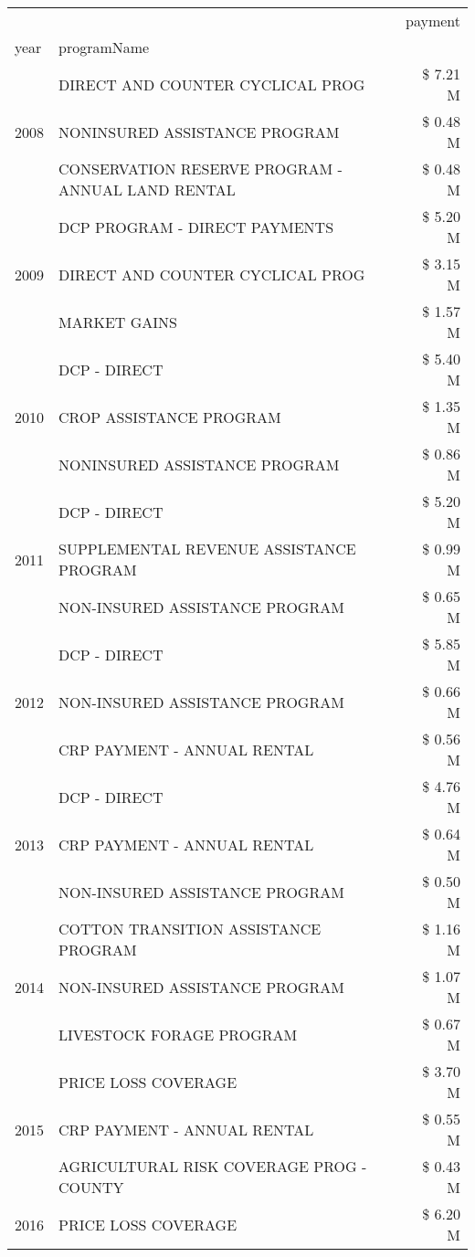 \begin{tabular}{llr}
\toprule
 &  & payment \\
year & programName &  \\
\midrule
\multirow[t]{3}{*}{2008} & DIRECT AND COUNTER CYCLICAL PROG & \$ 7.21 M \\
 & NONINSURED ASSISTANCE PROGRAM & \$ 0.48 M \\
 & CONSERVATION RESERVE PROGRAM - ANNUAL LAND RENTAL & \$ 0.48 M \\
\cline{1-3}
\multirow[t]{3}{*}{2009} & DCP PROGRAM - DIRECT PAYMENTS & \$ 5.20 M \\
 & DIRECT AND COUNTER CYCLICAL PROG & \$ 3.15 M \\
 & MARKET GAINS & \$ 1.57 M \\
\cline{1-3}
\multirow[t]{3}{*}{2010} & DCP - DIRECT & \$ 5.40 M \\
 & CROP ASSISTANCE PROGRAM & \$ 1.35 M \\
 & NONINSURED ASSISTANCE PROGRAM & \$ 0.86 M \\
\cline{1-3}
\multirow[t]{3}{*}{2011} & DCP - DIRECT & \$ 5.20 M \\
 & SUPPLEMENTAL REVENUE ASSISTANCE PROGRAM & \$ 0.99 M \\
 & NON-INSURED ASSISTANCE PROGRAM & \$ 0.65 M \\
\cline{1-3}
\multirow[t]{3}{*}{2012} & DCP - DIRECT & \$ 5.85 M \\
 & NON-INSURED ASSISTANCE PROGRAM & \$ 0.66 M \\
 & CRP PAYMENT - ANNUAL RENTAL & \$ 0.56 M \\
\cline{1-3}
\multirow[t]{3}{*}{2013} & DCP - DIRECT & \$ 4.76 M \\
 & CRP PAYMENT - ANNUAL RENTAL & \$ 0.64 M \\
 & NON-INSURED ASSISTANCE PROGRAM & \$ 0.50 M \\
\cline{1-3}
\multirow[t]{3}{*}{2014} & COTTON TRANSITION ASSISTANCE PROGRAM & \$ 1.16 M \\
 & NON-INSURED ASSISTANCE PROGRAM & \$ 1.07 M \\
 & LIVESTOCK FORAGE PROGRAM & \$ 0.67 M \\
\cline{1-3}
\multirow[t]{3}{*}{2015} & PRICE LOSS COVERAGE & \$ 3.70 M \\
 & CRP PAYMENT - ANNUAL RENTAL & \$ 0.55 M \\
 & AGRICULTURAL RISK COVERAGE PROG - COUNTY & \$ 0.43 M \\
\cline{1-3}
\multirow[t]{3}{*}{2016} & PRICE LOSS COVERAGE & \$ 6.20 M \\

\end{tabular}
